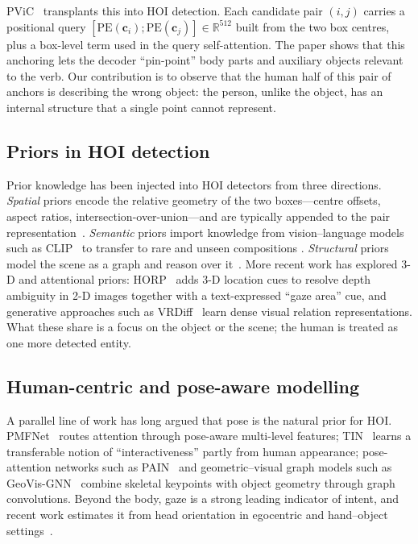 \documentclass[12pt,a4paper]{article}
\newcommand{\bc}{\mathbf{c}}
\newcommand{\PE}{\mathrm{PE}}
\newcommand{\R}{\mathbb{R}}
\begin{document}
PViC~\cite{zhang2023pvic} transplants this into HOI detection. Each candidate
pair $(i,j)$ carries a positional query
$[\PE(\bc_i); \PE(\bc_j)] \in \R^{512}$ built from the two box centres, plus a
box-level term used in the query self-attention. The paper shows that this
anchoring lets the decoder ``pin-point'' body parts and auxiliary objects
relevant to the verb. Our contribution is to observe that the human half of
this pair of anchors is describing the wrong object: the person, unlike the
object, has an internal structure that a single point cannot represent.

\subsection{Priors in HOI detection}
Prior knowledge has been injected into HOI detectors from three directions.
\emph{Spatial} priors encode the relative geometry of the two boxes---centre
offsets, aspect ratios, intersection-over-union---and are typically appended to
the pair representation~\cite{zhang2021scg,zhang2022upt}. \emph{Semantic}
priors import knowledge from vision--language models such as
CLIP~\cite{radford2021clip} to transfer to rare and unseen compositions
\cite{liao2022genvlkt,ning2023hoiclip,cao2023unihoi}. \emph{Structural} priors
model the scene as a graph and reason over it~\cite{zhang2021scg}. More recent
work has explored 3-D and attentional priors: HORP~\cite{liu2023horp} adds 3-D
location cues to resolve depth ambiguity in 2-D images together with a
text-expressed ``gaze area'' cue, and generative approaches such as
VRDiff~\cite{vrdiff} learn dense visual relation representations. What these
share is a focus on the object or the scene; the human is treated as one more
detected entity.

\subsection{Human-centric and pose-aware modelling}
A parallel line of work has long argued that pose is the natural prior for HOI.
PMFNet~\cite{wan2019pmfnet} routes attention through pose-aware multi-level
features; TIN~\cite{li2019tin} learns a transferable notion of
``interactiveness'' partly from human appearance; pose-attention networks such
as PAIN~\cite{pain} and geometric--visual graph models such as
GeoVis-GNN~\cite{geovisgnn} combine skeletal keypoints with object geometry
through graph convolutions. Beyond the body, gaze is a strong leading indicator
of intent, and recent work estimates it from head orientation in egocentric and
hand--object settings~\cite{hoigaze,hagi}.
\end{document}
